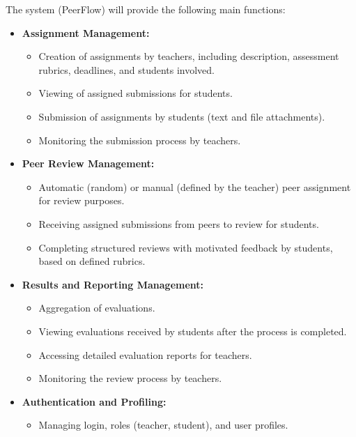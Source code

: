 \begin{justify}
    The system (PeerFlow) will provide the following main functions:
    \begin{itemize}
        \item \textbf{Assignment Management:}
        \begin{itemize}
            \item Creation of assignments by teachers, including description, assessment rubrics, deadlines, and students involved.
            \item Viewing of assigned submissions for students.
            \item Submission of assignments by students (text and file attachments).
            \item Monitoring the submission process by teachers.
        \end{itemize}
        \item \textbf{Peer Review Management:}
        \begin{itemize}
            \item Automatic (random) or manual (defined by the teacher) peer assignment for review purposes.
            \item Receiving assigned submissions from peers to review for students.
            \item Completing structured reviews with motivated feedback by students, based on defined rubrics.
        \end{itemize}
        \item \textbf{Results and Reporting Management:}
        \begin{itemize}
            \item Aggregation of evaluations.
            \item Viewing evaluations received by students after the process is completed.
            \item Accessing detailed evaluation reports for teachers.
            \item Monitoring the review process by teachers.
        \end{itemize}
        \item \textbf{Authentication and Profiling:}
        \begin{itemize}
            \item Managing login, roles (teacher, student), and user profiles.
        \end{itemize}
    \end{itemize}
\end{justify}

